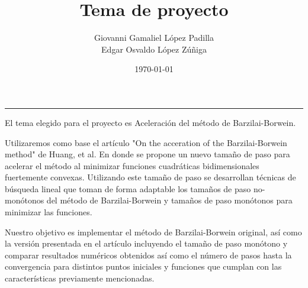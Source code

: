 \documentclass[10pt,a4paper]{article}
\title{\textbf{Tema de proyecto}}
\date{\today}
\author{Giovanni Gamaliel López Padilla \\ Edgar Osvaldo López Zúñiga}
\begin{document}
\maketitle
\vspace{-0.4in}
\noindent\rule{\textwidth}{0.5pt}

\par El tema elegido para el proyecto es Aceleración del método de Barzilai-Borwein. 
\par Utilizaremos como base el artículo "On the acceration of the Barzilai-Borwein method" de Huang, et al. En donde se propone un nuevo tamaño de paso para acelerar el método al minimizar funciones cuadráticas bidimensionales fuertemente convexas. Utilizando este tamaño de paso se desarrollan técnicas de búsqueda lineal que toman de forma adaptable los tamaños de paso no-monótonos del método de Barzilai-Borwein y tamaños de paso monótonos para minimizar las funciones.
\par Nuestro objetivo es implementar el método de Barzilai-Borwein original, así como la versión presentada en el artículo incluyendo el tamaño de paso monótono y comparar resultados numéricos obtenidos así como el número de pasos hasta la convergencia para distintos puntos iniciales y funciones que cumplan con las características previamente mencionadas.
\end{document}
